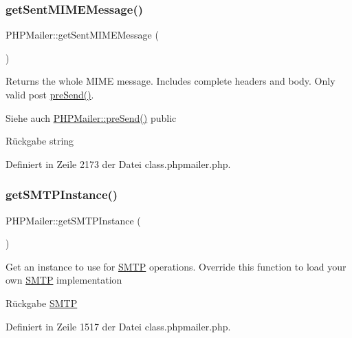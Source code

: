 \subsubsection{\texorpdfstring{get\+Sent\+M\+I\+M\+E\+Message()}{getSentMIMEMessage()}}
{\footnotesize\ttfamily P\+H\+P\+Mailer\+::get\+Sent\+M\+I\+M\+E\+Message (\begin{DoxyParamCaption}{ }\end{DoxyParamCaption})}

Returns the whole M\+I\+ME message. Includes complete headers and body. Only valid post \mbox{\hyperlink{class_p_h_p_mailer_aaef84591efbd9b09f178aae6221933f0}{pre\+Send()}}. \begin{DoxySeeAlso}{Siehe auch}
\mbox{\hyperlink{class_p_h_p_mailer_aaef84591efbd9b09f178aae6221933f0}{P\+H\+P\+Mailer\+::pre\+Send()}}  public 
\end{DoxySeeAlso}
\begin{DoxyReturn}{Rückgabe}
string 
\end{DoxyReturn}


Definiert in Zeile 2173 der Datei class.\+phpmailer.\+php.

\mbox{\label{class_p_h_p_mailer_ac3a22964fd24af953bad3454e961e616}} 
\subsubsection{\texorpdfstring{get\+S\+M\+T\+P\+Instance()}{getSMTPInstance()}}
{\footnotesize\ttfamily P\+H\+P\+Mailer\+::get\+S\+M\+T\+P\+Instance (\begin{DoxyParamCaption}{ }\end{DoxyParamCaption})}

Get an instance to use for \mbox{\hyperlink{class_s_m_t_p}{S\+M\+TP}} operations. Override this function to load your own \mbox{\hyperlink{class_s_m_t_p}{S\+M\+TP}} implementation \begin{DoxyReturn}{Rückgabe}
\mbox{\hyperlink{class_s_m_t_p}{S\+M\+TP}} 
\end{DoxyReturn}


Definiert in Zeile 1517 der Datei class.\+phpmailer.\+php.

\mbox{\label{class_p_h_p_mailer_af22f192632b6f6d8c48115dc9ee87953}} 

